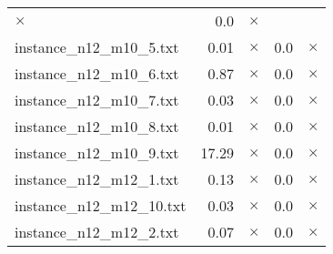 \documentclass{article}
\begin{document}
\begin{center}
\begin{tabular}{lrrrr}
$\times$
 & 0.0 & 
$\times$
\\
instance\_n12\_m10\_5.txt & 0.01 & 
$\times$
 & 0.0 & 
$\times$
\\
instance\_n12\_m10\_6.txt & 0.87 & 
$\times$
 & 0.0 & 
$\times$
\\
instance\_n12\_m10\_7.txt & 0.03 & 
$\times$
 & 0.0 & 
$\times$
\\
instance\_n12\_m10\_8.txt & 0.01 & 
$\times$
 & 0.0 & 
$\times$
\\
instance\_n12\_m10\_9.txt & 17.29 & 
$\times$
 & 0.0 & 
$\times$
\\
instance\_n12\_m12\_1.txt & 0.13 & 
$\times$
 & 0.0 & 
$\times$
\\
instance\_n12\_m12\_10.txt & 0.03 & 
$\times$
 & 0.0 & 
$\times$
\\
instance\_n12\_m12\_2.txt & 0.07 & 
$\times$
 & 0.0 & 
$\times$
\\
\hline\end{tabular}
\end{center}
\end{document}
